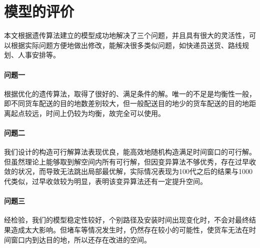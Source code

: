 \documentclass[UTF8,cs4size]{ctexart}
\begin{document}
\section{模型的评价}
本文根据遗传算法建立的模型成功地解决了三个问题，并且具有很大的灵活性，可以根据实际问题方便地做出修改，能解决很多类似问题，如快递员送货、路线规划、人事安排等。

\paragraph{问题一}
根据优化的遗传算法，取得了很好的、满足条件的解。唯一的不足是均衡性一般，即不同货车配送的目的地数差别较大，但一般配送目的地少的货车配送的目的地距离起点较远，时间上仍较为均衡，故完全可以使用。
\paragraph{问题二}
我们设计的构造可行解算法表现优良，能高效地随机构造满足时间窗口的可行解。但虽然理论上能够取到解空间内所有可行解，但因变异算法不够优秀，存在过早收敛的状况，而导致无法跳出局部最优解，实际情况表现为100代之后的结果与1000代类似，过早收敛较为明显，表明该变异算法还有一定提升空间。
\paragraph{问题三}
经检验，我们的模型稳定性较好，个别路径及安装时间出现变化时，不会对最终结果造成太大影响。但堵车等情况发生时，仍然存在较小的可能性，使货车无法在时间窗口内到达目的地，所以还存在改进的空间。
\clearpage
\appendix
\end{document}

